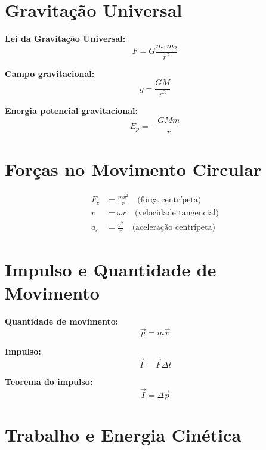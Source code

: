 \documentclass[a4paper,12pt]{article}
\begin{document}
\begin{multicols}{2}
\section{Gravitação Universal}

\textbf{Lei da Gravitação Universal:}
\begin{equation*}
  F = G \frac{m_1 m_2}{r^2}
\end{equation*}

\textbf{Campo gravitacional:}
\begin{equation*}
  g = \frac{G M}{r^2}
\end{equation*}

\textbf{Energia potencial gravitacional:}
\begin{equation*}
  E_p = -\frac{G M m}{r}
\end{equation*}

\section{Forças no Movimento Circular}

\begin{align*}
  F_c &= \frac{m v^2}{r} \quad \text{(força centrípeta)} \\
  v &= \omega r \quad \text{(velocidade tangencial)} \\
  a_c &= \frac{v^2}{r} \quad \text{(aceleração centrípeta)}
\end{align*}

\section{Impulso e Quantidade de Movimento}

\textbf{Quantidade de movimento:}
\begin{equation*}
  \vec{p} = m \vec{v}
\end{equation*}

\textbf{Impulso:}
\begin{equation*}
  \vec{I} = \vec{F} \Delta t
\end{equation*}

\textbf{Teorema do impulso:}
\begin{equation*}
  \vec{I} = \Delta \vec{p}
\end{equation*}

\section{Trabalho e Energia Cinética}


\end{multicols}
\end{document}
